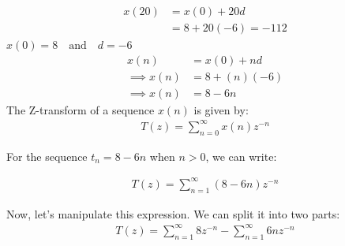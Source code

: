 \documentclass[journal,12pt,twocolumn]{IEEEtran}
\theoremstyle{remark}
\begin{document}
    \begin{align}
        x(20)&=x(0)+20d\\
        &=8+20(-6) = -112
    \end{align}
\centering
$x(0) = 8\quad \text{and}\quad d = -6$
    \begin{align}
    x(n)&=x(0)+nd\\
    \implies x(n)&=8+(n)(-6)\\
    \implies x(n)&=8-6n
    \end{align}    
The Z-transform of a sequence $x(n)$ is given by:
    \begin{align}
    T(z) = \sum_{n=0}^{\infty} x(n) z^{-n} 
    \end{align}

For the sequence $t_n = 8 - 6n$ when $n > 0$, we can write:

    \begin{align}
    T(z) = \sum_{n=1}^{\infty} (8 - 6n)z^{-n}
    \end{align}

Now, let's manipulate this expression. We can split it into two parts:
    \begin{align}
     T(z) = \sum_{n=1}^{\infty} 8z^{-n} - \sum_{n=1}^{\infty} 6nz^{-n} 
    \end{align}
    
\end{document}
